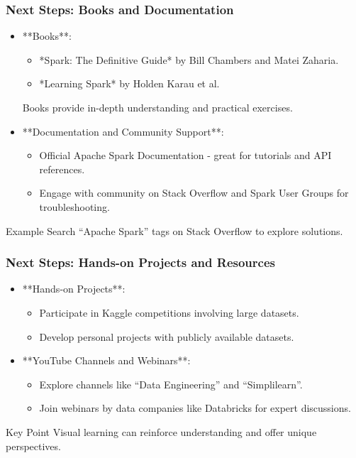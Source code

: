 \documentclass[aspectratio=169]{beamer}
\begin{document}
\begin{frame}[fragile]
    \frametitle{Next Steps: Books and Documentation}
    \begin{itemize}
        \item **Books**:
        \begin{itemize}
            \item *Spark: The Definitive Guide* by Bill Chambers and Matei Zaharia.
            \item *Learning Spark* by Holden Karau et al.
        \end{itemize}
        Books provide in-depth understanding and practical exercises.
        
        \item **Documentation and Community Support**:
        \begin{itemize}
            \item Official Apache Spark Documentation - great for tutorials and API references.
            \item Engage with community on Stack Overflow and Spark User Groups for troubleshooting.
        \end{itemize}
    \end{itemize}
    
    \begin{block}{Example}
        Search “Apache Spark” tags on Stack Overflow to explore solutions.
    \end{block}
\end{frame}

\begin{frame}[fragile]
    \frametitle{Next Steps: Hands-on Projects and Resources}
    \begin{itemize}
        \item **Hands-on Projects**:
        \begin{itemize}
            \item Participate in Kaggle competitions involving large datasets.
            \item Develop personal projects with publicly available datasets.
        \end{itemize}
        
        \item **YouTube Channels and Webinars**:
        \begin{itemize}
            \item Explore channels like ``Data Engineering'' and ``Simplilearn''.
            \item Join webinars by data companies like Databricks for expert discussions.
        \end{itemize}
    \end{itemize}
    
    \begin{block}{Key Point}
        Visual learning can reinforce understanding and offer unique perspectives.
    \end{block}
\end{frame}
\end{document}
